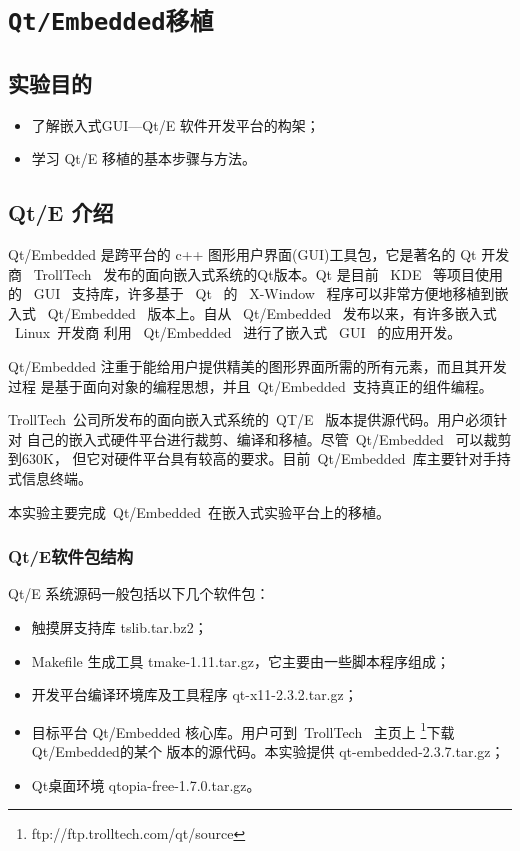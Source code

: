 \chapter{\tt Qt/Embedded移植}
\section{实验目的}
\begin{itemize}\itemsep=-3pt
  \item 了解嵌入式GUI---Qt/E 软件开发平台的构架；
  \item 学习 Qt/E 移植的基本步骤与方法。
\end{itemize}

\section{Qt/E 介绍}
	Qt/Embedded 是跨平台的 c++ 图形用户界面(GUI)工具包，它是著名的 Qt 开发商
~TrollTech~ 发布的面向嵌入式系统的Qt版本。Qt 是目前 ~KDE~ 等项目使用的 ~GUI~
支持库，许多基于 ~Qt~ 的 ~X-Window~ 程序可以非常方便地移植到嵌入式
~Qt/Embedded~ 版本上。自从 ~Qt/Embedded~ 发布以来，有许多嵌入式 ~Linux~开发商
利用 ~Qt/Embedded~ 进行了嵌入式 ~GUI~ 的应用开发。

	Qt/Embedded 注重于能给用户提供精美的图形界面所需的所有元素，而且其开发过程
是基于面向对象的编程思想，并且~Qt/Embedded~支持真正的组件编程。

	TrollTech~公司所发布的面向嵌入式系统的~QT/E~ 版本提供源代码。用户必须针对
自己的嵌入式硬件平台进行裁剪、编译和移植。尽管~Qt/Embedded~ 可以裁剪到630K，
但它对硬件平台具有较高的要求。目前~Qt/Embedded~库主要针对手持式信息终端。

	本实验主要完成~Qt/Embedded~在嵌入式实验平台上的移植。
\subsection{Qt/E软件包结构}
	Qt/E 系统源码一般包括以下几个软件包：
\begin{itemize}\itemsep=-3pt
  \item 触摸屏支持库 tslib.tar.bz2；
  \item Makefile 生成工具 tmake-1.11.tar.gz，它主要由一些脚本程序组成；
  \item 开发平台编译环境库及工具程序 qt-x11-2.3.2.tar.gz；
  \item 目标平台 Qt/Embedded 核心库。用户可到~TrollTech~ 主页上
		\footnote{ftp://ftp.trolltech.com/qt/source}下载Qt/Embedded的某个
		版本的源代码。本实验提供 qt-embedded-2.3.7.tar.gz；
  \item Qt桌面环境 qtopia-free-1.7.0.tar.gz。
\end{itemize}

